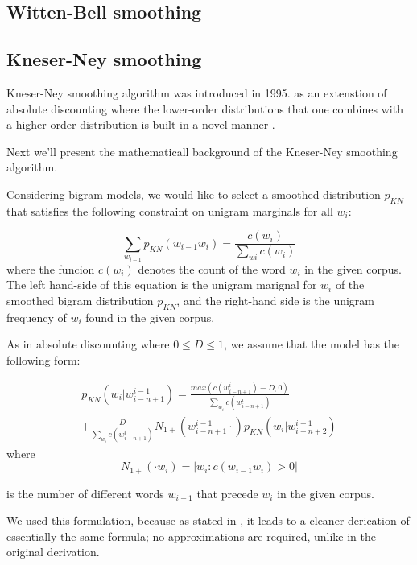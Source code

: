 \documentclass[twoside]{article}
\begin{document}
\begin{multicols}{2}
\subsection{Witten-Bell smoothing}

\subsection{Kneser-Ney smoothing}
Kneser-Ney smoothing algorithm was introduced in 1995. as an extenstion of absolute discounting where the lower-order distributions that one combines with a higher-order distribution is built in a novel manner \cite{1_chen1999empirical}. 

Next we\rq{}ll present the mathematicall background of the Kneser-Ney smoothing algorithm.

Considering bigram models, we would like to select a smoothed distribution $p_{KN}$ that satisfies the following constraint on unigram marginals for all $w_i$:

\begin{equation}
\sum_{w_{i - 1}} p_{KN}(w_{i-1}w_{i} ) = \frac{c(w_{i})}{\sum_{w{i}} c(w_{i})}
\end{equation}
where the funcion $c(w_{i})$ denotes the count of the word $w_{i}$ in the given corpus. The left hand-side of this equation is the unigram marignal for $w_{i}$ of the smoothed bigram distribution $p_{KN}$, and the right-hand side is the unigram frequency of $w_{i}$ found in the given corpus.

As in absolute discounting where $0 \le D \le 1$, we assume that the model has the following form:

\begin{multline}
p_{KN}(w_{i} | w_{i-n+1}^{i-1}) = \frac{max(c(w_{i-n+1}^{i}) - D, 0)}{\sum_{w_{i}} c(w_{i-n+1}^{i})}  \\ + \frac{D}{\sum_{w_{i}} c(w_{i-n+1}^{i})} N_{1+}(w_{i-n+1}^{i-1} \cdot) p_{KN}(w_{i} | w_{i-n+2}^{i-1}) 
\end{multline}
where 
\begin{equation}
N_{1+}(\cdot w_{i}) = |{w_{i} : c(w_{i-1}w_{i}) > 0}|
\end{equation}

is the number of different words $w_{i-1}$ that precede $w_{i}$ in the given corpus.

We used this formulation, because as stated in \cite{1_chen1999empirical}, it leads to a cleaner derication of essentially the same formula; no approximations are required, unlike in the original derivation.


\end{multicols}
\end{document}
